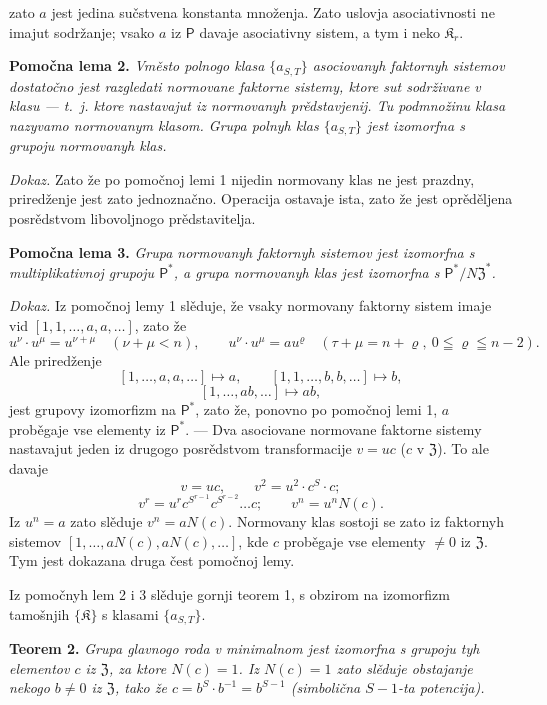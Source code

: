 \documentclass[11pt]{article}
\begin{document}
zato \(a\) jest jedina sučstvena konstanta množenja. Zato uslovja asociativnosti ne imajut sodržanje; vsako \(a\) iz \(\mathsf{P}\) davaje asociativny sistem, a tym i neko \(\mathfrak K_r\).

\noindent\textbf{Pomočna lema 2.} \emph{Vměsto polnogo klasa \(\{a_{S,T}\}\) asociovanyh faktornyh sistemov dostatočno jest razgledati normovane faktorne sistemy, ktore sut sodrživane v klasu --- t.~j. ktore nastavajut iz normovanyh prědstavjenij. Tu podmnožinu klasa nazyvamo normovanym klasom. Grupa polnyh klas \(\{a_{S,T}\}\) jest izomorfna s grupoju normovanyh klas.}

\noindent\emph{Dokaz.} Zato že po pomočnoj lemi 1 nijedin normovany klas ne jest prazdny, priredženje jest zato jednoznačno. Operacija ostavaje ista, zato že jest oprěděljena posrědstvom libovoljnogo prědstavitelja.

\noindent\textbf{Pomočna lema 3.} \emph{Grupa normovanyh faktornyh sistemov jest izomorfna s multiplikativnoj grupoju \(\mathsf{P}^*\), a grupa normovanyh klas jest izomorfna s \(\mathsf{P}^*/N\mathfrak Z^*\).}

\noindent\emph{Dokaz.} Iz pomočnoj lemy 1 slěduje, že vsaky normovany faktorny sistem imaje vid \([1,1,\ldots,a,a,\ldots]\), zato že
\[
u^\nu\cdot u^\mu=u^{\nu+\mu}\quad(\nu+\mu<n),
\qquad
u^\nu\cdot u^\mu=au^\varrho\quad(\tau+\mu=n+\varrho,\ 0\leqq\varrho\leqq n-2).
\]
Ale priredženje
\[
[1,\ldots,a,a,\ldots]\mapsto a,
\qquad
[1,1,\ldots,b,b,\ldots]\mapsto b,
\]
\[
[1,\ldots,ab,\ldots]\mapsto ab,
\]
jest grupovy izomorfizm na \(\mathsf{P}^*\), zato že, ponovno po pomočnoj lemi 1, \(a\) proběgaje vse elementy iz \(\mathsf{P}^*\). --- Dva asociovane normovane faktorne sistemy nastavajut jeden iz drugogo posrědstvom transformacije \(v=uc\) (\(c\) v \(\mathfrak Z\)). To ale davaje
\[
v=uc,\qquad v^2=u^2\cdot c^S\cdot c;
\]
\[
v^r=u^r c^{S^{r-1}}c^{S^{r-2}}\ldots c;
\qquad
v^n=u^nN(c).
\]
Iz \(u^n=a\) zato slěduje \(v^n=aN(c)\). Normovany klas sostoji se zato iz faktornyh sistemov \([1,\ldots,aN(c),aN(c),\ldots]\), kde \(c\) proběgaje vse elementy \(\neq0\) iz \(\mathfrak Z\). Tym jest dokazana druga čest pomočnoj lemy.

Iz pomočnyh lem 2 i 3 slěduje gornji teorem 1, s obzirom na izomorfizm tamošnjih \(\{\mathfrak K\}\) s klasami \(\{a_{S,T}\}\).

\noindent\textbf{Teorem 2.} \emph{Grupa glavnogo roda v minimalnom jest izomorfna s grupoju tyh elementov \(c\) iz \(\mathfrak Z\), za ktore \(N(c)=1\). Iz \(N(c)=1\) zato slěduje obstajanje nekogo \(b\neq0\) iz \(\mathfrak Z\), tako že \(c=b^S\cdot b^{-1}=b^{S-1}\) (simbolična \(S-1\)-ta potencija).}
\end{document}
